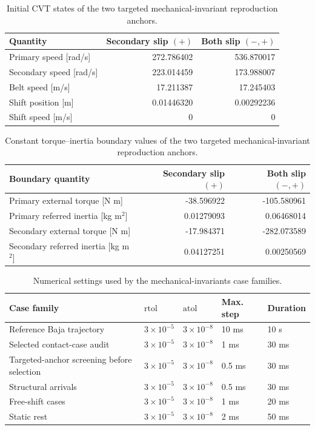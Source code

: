 \documentclass[11pt]{report}
\numberwithin{equation}{section}
\begin{document}
\begin{table}[H]
\centering
\small
\caption{Initial CVT states of the two targeted mechanical-invariant reproduction anchors.}
\label{tab:invariants_rare_anchor_states}
\begin{tabular}{@{}p{}rr@{}}
\toprule
Quantity & Secondary slip \((+)\) & Both slip \((-,+)\) \\ \midrule
Primary speed [rad/s] & 272.786402 & 536.870017 \\
Secondary speed [rad/s] & 223.014459 & 173.988007 \\
Belt speed [m/s] & 17.211387 & 17.245403 \\
Shift position [m] & 0.01446320 & 0.00292236 \\
Shift speed [m/s] & 0 & 0 \\
\bottomrule
\end{tabular}
\end{table}

\begin{table}[H]
\centering
\small
\caption{Constant torque--inertia boundary values of the two targeted mechanical-invariant reproduction anchors.}
\label{tab:invariants_rare_anchor_boundaries}
\begin{tabular}{@{}p{}rr@{}}
\toprule
Boundary quantity & Secondary slip \((+)\) & Both slip \((-,+)\) \\ \midrule
Primary external torque [N m] & -38.596922 & -105.580961 \\
Primary referred inertia [kg m$^2$] & 0.01279093 & 0.06468014 \\
Secondary external torque [N m] & -17.984371 & -282.073589 \\
Secondary referred inertia [kg m$^2$] & 0.04127251 & 0.00250569 \\
\bottomrule
\end{tabular}
\end{table}

\begin{table}[H]
\centering
\small
\caption{Numerical settings used by the mechanical-invariants case families.}
\label{tab:invariants_numerics}
\begin{tabular}{@{}p{}p{}p{}p{}p{}@{}}
\toprule
Case family & $\mathrm{rtol}$ & $\mathrm{atol}$ & Max. step & Duration \\ \midrule
Reference Baja trajectory & $3\times10^{-5}$ & $3\times10^{-8}$ & 10 ms & 10 s \\
Selected contact-case audit & $3\times10^{-5}$ & $3\times10^{-8}$ & 1 ms & 30 ms \\
Targeted-anchor screening before selection & $3\times10^{-5}$ & $3\times10^{-8}$ & 0.5 ms & 30 ms \\
Structural arrivals & $3\times10^{-5}$ & $3\times10^{-8}$ & 0.5 ms & 30 ms \\
Free-shift cases & $3\times10^{-5}$ & $3\times10^{-8}$ & 1 ms & 20 ms \\
Static rest & $3\times10^{-5}$ & $3\times10^{-8}$ & 2 ms & 50 ms \\
\bottomrule
\end{tabular}
\end{table}
\end{document}
